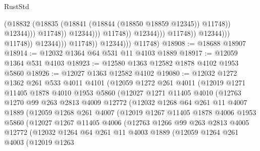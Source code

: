 \begin{lexlean}{RustStd}
\begin{coremodule}
                                                            (@18832
                                                              (@18835
                                                                (@18841
                                                                  (@18844 (@18850 @18859 @12345))
                                                                  @11748))
                                                              @12344)))
                                                        @11748))
                                                    @12344)))
                                              @11748))
                                          @12344)))
                                    @11748))
                                @12344)))
                          @11748))
                      @12344)))
                @11748))
            @12344)))
      @11748)
@18908 := @18688 @18907
@18914 := @12032 @1364 @64 @531 @11 @4103 @1889
@18917 := @12059 @1364 @531 @4103
@18923 := @12580 @1363 @12582 @1878 @4102 @1953 @5860
@18926 := @12027 @1363 @12582 @4102
@19080 := @12032
    @1272
    @1362
    @261
    @533
    @4011
    @4101
    (@12059
      @1272
      @261
      @4011
      (@12019
        @1271
        @11405
        @1878
        @4010
        @1953
        @5860
        (@12027
          @1271
          @11405
          @4010
          (@12763
            @1270
            @99
            @263
            @2813
            @4009
            @12772
            (@12032
              @1268
              @64
              @261
              @11
              @4007
              @1889
              (@12059
                @1268
                @261
                @4007
                (@12019
                  @1267
                  @11405
                  @1878
                  @4006
                  @1953
                  @5860
                  (@12027
                    @1267
                    @11405
                    @4006
                    (@12763
                      @1266
                      @99
                      @263
                      @2813
                      @4005
                      @12772
                      (@12032
                        @1264
                        @64
                        @261
                        @11
                        @4003
                        @1889
                        (@12059
                          @1264
                          @261
                          @4003
                          (@12019
                            @1263

\end{coremodule}
\end{lexlean}

